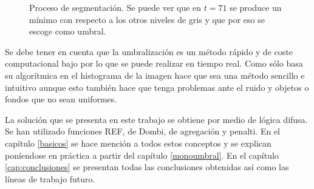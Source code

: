 \begin{figure}
\centering
	\quad
	\quad
	\caption{Proceso de segmentación. Se puede ver que en $t=71$ se produce un mínimo con respecto a los otros niveles de gris y que por eso se escoge como umbral.}
	\label{img:rice}
\end{figure}


Se debe tener en cuenta que la umbralización es un método rápido y de coste computacional bajo por lo que se puede realizar en tiempo real. Como sólo basa su algorítmica en el histograma de la imagen hace que sea una método sencillo e intuitivo aunque esto también hace que tenga problemas ante el ruido y objetos o fondos que no sean uniformes.

La solución que se presenta en este trabajo se obtiene por medio de lógica difusa. Se han utilizado funciones REF, de Dombi, de agregación y penalti. En el capítulo \ref{basicos} se hace mención a todos estos conceptos y se explican poníendose en práctica a partir del capítulo \ref{monoumbral}. En el capítulo \ref{cap:conclusiones} se presentan todas las conclusiones obtenidas así como las líneas de trabajo futuro.

